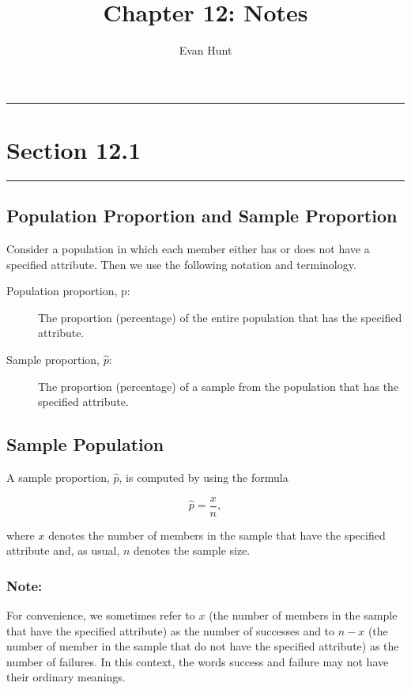 \documentclass[12pt]{article}
\title{Chapter 12: Notes}
\author{Evan Hunt}
\begin{document}
    \maketitle

    \noindent\rule{\textwidth}{0.4pt}
    \section*{Section 12.1}
    \noindent\rule{\textwidth}{0.4pt}
        \subsection*{Population Proportion and Sample Proportion}
            Consider a population in which each member either has or does not have a specified
            attribute. Then we use the following notation and terminology.
            \begin{description}
                \item[Population proportion, p:] The proportion (percentage) of the entire
                population that has the specified attribute.
                \item[Sample proportion, $\hat{p}$:] The proportion (percentage) of a sample
                from the population that has the specified attribute. 
            \end{description}
        \subsection*{Sample Population}
            A sample proportion, $\hat{p}$, is computed by using the formula
            \begin{center}
                \[
                    \hat{p} = \frac{x}{n},    
                \]
            \end{center}
            where $x$ denotes the number of members in the sample that have the specified
            attribute and, as usual, $n$ denotes the sample size.
            \subsubsection*{Note:}
                For convenience, we sometimes refer to $x$ (the number of members in the sample
                that have the specified attribute) as the number of successes and to $n - x$
                (the number of member in the sample that do not have the specified attribute)
                as the number of failures. In this context, the words success and failure may
                not have their ordinary meanings.
\end{document}
